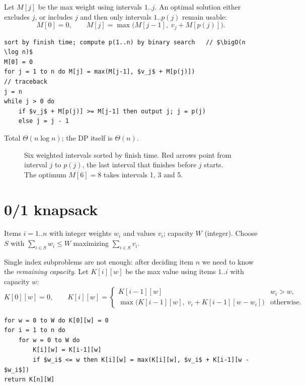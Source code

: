 Let $M[j]$ be the max weight using intervals $1..j$. An optimal solution either excludes $j$, or includes $j$ and then
only intervals $1..p(j)$ remain usable:
\[
M[0]=0,\qquad M[j]=\max\bigl(M[j-1],\;v_j+M[p(j)]\bigr).
\]
\begin{lstlisting}[style=pseudo]
sort by finish time; compute p(1..n) by binary search   // $\bigO(n \log n)$
M[0] = 0
for j = 1 to n do M[j] = max(M[j-1], $v_j$ + M[p(j)])
// traceback
j = n
while j > 0 do
    if $v_j$ + M[p(j)] >= M[j-1] then output j; j = p(j)
    else j = j - 1
\end{lstlisting}
Total $\Theta(n\log n)$; the DP itself is $\Theta(n)$.

\begin{figure}[H]
\centering
{}
\caption{Six weighted intervals sorted by finish time. Red arrows point
from interval $j$ to $p(j)$, the last interval that finishes before $j$
starts. The optimum $M[6]=8$ takes intervals 1, 3 and 5.}
\end{figure}

\section{0/1 knapsack}
Items $i=1..n$ with integer weights $w_i$ and values $v_i$; capacity $W$ (integer). Choose $S$ with $\sum_{i\in S}w_i\le W$ maximizing $\sum_{i\in S}v_i$.

Single index subproblems are not enough: after deciding item $n$ we need to know the \emph{remaining capacity}.
Let $K[i][w]$ be the max value using items $1..i$ with capacity $w$:
\[
K[0][w]=0,\qquad K[i][w]=\begin{cases}K[i-1][w] & w_i>w,\\ \max\bigl(K[i-1][w],\;v_i+K[i-1][w-w_i]\bigr) & \text{otherwise.}\end{cases}
\]
\begin{lstlisting}[style=pseudo]
for w = 0 to W do K[0][w] = 0
for i = 1 to n do
    for w = 0 to W do
        K[i][w] = K[i-1][w]
        if $w_i$ <= w then K[i][w] = max(K[i][w], $v_i$ + K[i-1][w - $w_i$])
return K[n][W]
\end{lstlisting}

